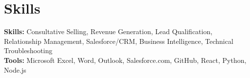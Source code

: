 \documentclass[11pt]{article}       %
\begin{document}

\vspace{-18.5pt}


\section*{Skills}
\textbf{Skills:} Consultative Selling, Revenue Generation, Lead Qualification, Relationship Management, Salesforce/CRM, Business Intelligence, Technical Troubleshooting\\
\textbf{Tools:} Microsoft Excel, Word, Outlook, Salesforce.com, GitHub, React, Python, Node.js\\

\vspace{-6.5pt}
\end{document}
